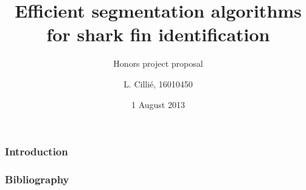 \documentclass{beamer}
\title{Efficient segmentation algorithms for shark fin identification}
\subtitle{Honors project proposal}
\author{L. Cilli\'{e}, 16010450}
\date{1 August 2013}
\institute{Department of Applied Mathematics, Stellenbosch University}
\begin{document}
\maketitle

\begin{frame}
\frametitle{Introduction}
\end{frame}

\begin{frame}
\frametitle{}
\end{frame}

\begin{frame}
\frametitle{}
\end{frame}

\begin{frame}
\frametitle{} 
\end{frame}

\begin{frame}
\frametitle{}
\end{frame}

\begin{frame}
\frametitle{}
\end{frame}

\begin{frame}
\frametitle{}
\end{frame}

\begin{frame}
\frametitle{} 
\end{frame}

\begin{frame}
\frametitle{}
\end{frame}

\begin{frame}
\frametitle{Bibliography}


\end{frame}
\end{document}

